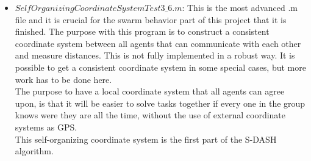 \begin{itemize}
\item $SelfOrganizingCoordinateSystemTest3\_6.m$: This is the most advanced .m file and it is crucial for the swarm behavior part of this project that it is finished. The purpose with this program is to construct a consistent coordinate system between all agents that can communicate with each other and measure distances. This is not fully implemented in a robust way. It is possible to get a consistent coordinate system in some special cases, but more work has to be done here.\\
The purpose to have a local coordinate system that all agents can agree upon, is that it will be easier to solve tasks together if every one in the group knows were they are all the time, without the use of external coordinate systems as GPS.\\
This self-organizing coordinate system is the first part of the S-DASH algorithm.
\end{itemize}









